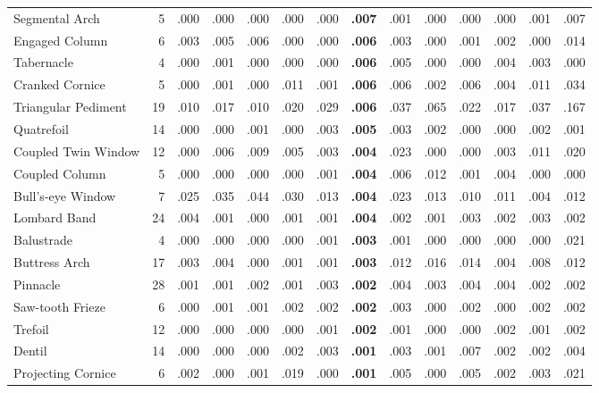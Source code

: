 \documentclass[lineno,pdflatex,sn-mathphys-num]{sn-jnl}%
\theoremstyle{thmstyleone}%
\theoremstyle{thmstyletwo}%
\theoremstyle{thmstylethree}%
\begin{document}
\begin{appendices}
\begin{table}[!htbp]
\begin{tabular}{@{}lrcccccccccccc@{}}
Segmental Arch & 5 & .000 & .000 & .000 & .000 & .000 & \textbf{.007} & .001 & .000 & .000 & .000 & .001 & .007 \\
Engaged Column & 6 & .003 & .005 & .006 & .000 & .000 & \textbf{.006} & .003 & .000 & .001 & .002 & .000 & .014 \\
Tabernacle & 4 & .000 & .001 & .000 & .000 & .000 & \textbf{.006} & .005 & .000 & .000 & .004 & .003 & .000 \\
Cranked Cornice & 5 & .000 & .001 & .000 & .011 & .001 & \textbf{.006} & .006 & .002 & .006 & .004 & .011 & .034 \\
Triangular Pediment & 19 & .010 & .017 & .010 & .020 & .029 & \textbf{.006} & .037 & .065 & .022 & .017 & .037 & .167 \\
Quatrefoil & 14 & .000 & .000 & .001 & .000 & .003 & \textbf{.005} & .003 & .002 & .000 & .000 & .002 & .001 \\
Coupled Twin Window & 12 & .000 & .006 & .009 & .005 & .003 & \textbf{.004} & .023 & .000 & .000 & .003 & .011 & .020 \\
Coupled Column & 5 & .000 & .000 & .000 & .000 & .001 & \textbf{.004} & .006 & .012 & .001 & .004 & .000 & .000 \\
Bull's-eye Window & 7 & .025 & .035 & .044 & .030 & .013 & \textbf{.004} & .023 & .013 & .010 & .011 & .004 & .012 \\
Lombard Band & 24 & .004 & .001 & .000 & .001 & .001 & \textbf{.004} & .002 & .001 & .003 & .002 & .003 & .002 \\
Balustrade & 4 & .000 & .000 & .000 & .000 & .001 & \textbf{.003} & .001 & .000 & .000 & .000 & .000 & .021 \\
Buttress Arch & 17 & .003 & .004 & .000 & .001 & .001 & \textbf{.003} & .012 & .016 & .014 & .004 & .008 & .012 \\
Pinnacle & 28 & .001 & .001 & .002 & .001 & .003 & \textbf{.002} & .004 & .003 & .004 & .004 & .002 & .002 \\
Saw-tooth Frieze & 6 & .000 & .001 & .001 & .002 & .002 & \textbf{.002} & .003 & .000 & .002 & .000 & .002 & .002 \\
Trefoil & 12 & .000 & .000 & .000 & .000 & .001 & \textbf{.002} & .001 & .000 & .000 & .002 & .001 & .002 \\
Dentil & 14 & .000 & .000 & .000 & .002 & .003 & \textbf{.001} & .003 & .001 & .007 & .002 & .002 & .004 \\
Projecting Cornice & 6 & .002 & .000 & .001 & .019 & .000 & \textbf{.001} & .005 & .000 & .005 & .002 & .003 & .021 \\

\end{tabular}
\end{table}
\end{appendices}
\end{document}
